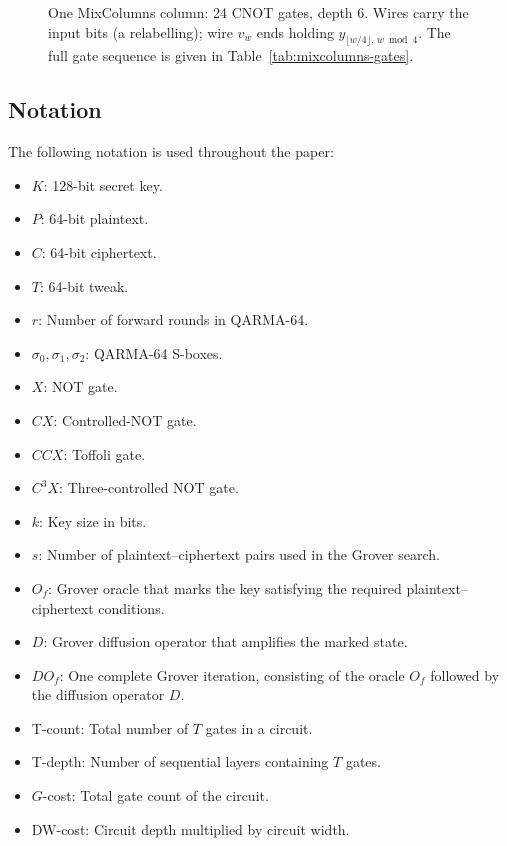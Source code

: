 \documentclass[runningheads,10pt]{llncs}
\begin{document}
\begin{figure}[htbp]
\centering
{}
\caption{One MixColumns column: 24 CNOT gates, depth 6. Wires carry the input bits (a relabelling); wire $v_w$ ends holding $y_{\lfloor w/4\rfloor,\, w\bmod 4}$. The full gate sequence is given in Table~\ref{tab:mixcolumns-gates}.}
\label{fig:mixcolumns}
\end{figure}

\clearpage
\subsection{Notation}

The following notation is used throughout the paper:

\begin{itemize}
    \item $K$: 128-bit secret key.
    \item $P$: 64-bit plaintext.
    \item $C$: 64-bit ciphertext.
    \item $T$: 64-bit tweak.
    \item $r$: Number of forward rounds in QARMA-64.
    \item $\sigma_0,\sigma_1,\sigma_2$: QARMA-64 S-boxes.
    \item $X$: NOT gate.
    \item $CX$: Controlled-NOT gate.
    \item $CCX$: Toffoli gate.
    \item $C^3X$: Three-controlled NOT gate.
    \item $k$: Key size in bits.
    \item $s$: Number of plaintext--ciphertext pairs used in the Grover search.
    \item $O_f$: Grover oracle that marks the key satisfying the required plaintext--ciphertext conditions.
    \item $D$: Grover diffusion operator that amplifies the marked state.
    \item $DO_f$: One complete Grover iteration, consisting of the oracle $O_f$ followed by the diffusion operator $D$.
    \item T-count: Total number of $T$ gates in a circuit.
    \item T-depth: Number of sequential layers containing $T$ gates.
    \item $G$-cost: Total gate count of the circuit.
    \item DW-cost: Circuit depth multiplied by circuit width.
\end{itemize}
\end{document}
